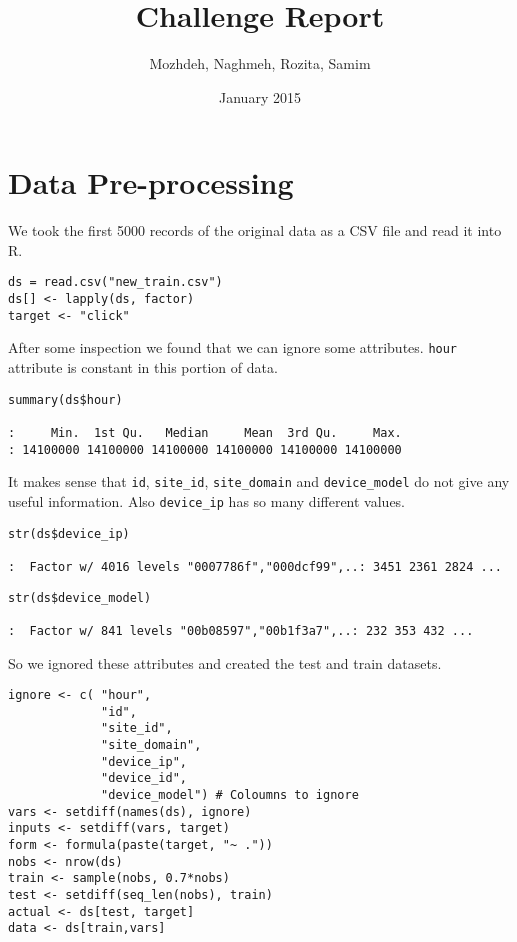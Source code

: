 \documentclass[11pt,a4paper]{article}
\author{Mozhdeh, Naghmeh, Rozita, Samim}
\date{January 2015}
\title{Challenge Report}
\begin{document}
\maketitle

\section{Data Pre-processing}
\label{sec-1}
We took the first 5000 records of the original data as a CSV file and read it into
R.

\begin{verbatim}
ds = read.csv("new_train.csv")
ds[] <- lapply(ds, factor)
target <- "click"
\end{verbatim}

After some inspection we found that we can ignore some attributes. \texttt{hour} attribute is
constant in this portion of data.

\begin{verbatim}
summary(ds$hour)

:     Min.  1st Qu.   Median     Mean  3rd Qu.     Max. 
: 14100000 14100000 14100000 14100000 14100000 14100000
\end{verbatim}

It makes sense that \texttt{id}, \texttt{site\_id}, \texttt{site\_domain} and \texttt{device\_model} do not give any 
useful information. Also \texttt{device\_ip} has so many different values.

\begin{verbatim}
str(ds$device_ip)

:  Factor w/ 4016 levels "0007786f","000dcf99",..: 3451 2361 2824 ...
\end{verbatim}

\begin{verbatim}
str(ds$device_model)

:  Factor w/ 841 levels "00b08597","00b1f3a7",..: 232 353 432 ...
\end{verbatim}


So we ignored these attributes and created the test and train datasets.

\begin{verbatim}
ignore <- c( "hour", 
             "id",
             "site_id",
             "site_domain",
             "device_ip", 
             "device_id", 
             "device_model") # Coloumns to ignore
vars <- setdiff(names(ds), ignore)
inputs <- setdiff(vars, target)
form <- formula(paste(target, "~ ."))
nobs <- nrow(ds)
train <- sample(nobs, 0.7*nobs)
test <- setdiff(seq_len(nobs), train)
actual <- ds[test, target]
data <- ds[train,vars]
\end{verbatim}
\end{document}
